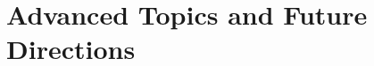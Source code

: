\documentclass[11pt,openright,twoside,a4paper]{book}
\begin{document}
\part{Advanced Topics and Future Directions}



\appendix


\backmatter


\printindex
\end{document}
